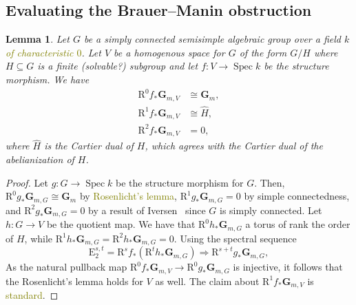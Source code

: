 \documentclass[10pt,letterpaper,twoside]{article}
\newcommand{\BA}[1]{\textcolor{olive}{#1}}
\newcommand{\E}{\mathrm{E}}
\newcommand{\R}{\mathrm{R}}
\renewcommand{\1}{\mathbf{1}}
\newcommand{\bG}{\mathbf{G}}
\newcommand{\Gm}{\bG_{m}}
\DeclareMathOperator{\Spec}{Spec}
\newcommand{\iso}{\cong}
\theoremstyle{plain}
\newtheorem{lemma}[theorem]{Lemma}
\theoremstyle{plain}
\theoremstyle{definition}
\theoremstyle{named}
\theoremstyle{definition}
\begin{document}
	
	
	\subsection{Evaluating the Brauer--Manin obstruction}
	
	
	\begin{lemma}
		Let $G$ be a simply connected semisimple algebraic group over a field $k$ \BA{of characteristic
			$0$}. Let $V$ be a homogenous space for $G$ of
		the form $G/H$ where $H\subseteq G$ is a finite (solvable?) subgroup and let $f\colon
		V\rightarrow\Spec k$ be the structure morphism. We have
		\begin{align*}
			\R^0f_*\bG_{m,V}&\iso\Gm,\\
			\R^1f_*\bG_{m,V}&\iso\widehat{H},\\
			\R^2f_*\bG_{m,V}&=0,
		\end{align*}
		where $\widehat{H}$ is the Cartier dual of $H$, which agrees with the Cartier dual of the
		abelianization of $H$.
	\end{lemma}
	
	\begin{proof}
		Let $g\colon G\rightarrow\Spec k$ be the structure morphism for $G$.
		Then, $\R^0g_*\bG_{m,G}\iso\Gm$ by
		\BA{Rosenlicht's lemma}, $\R^1g_*\bG_{m,G}=0$ by simple connectedness, and $\R^2g_*\bG_{m,G}=0$
		by a result of Iversen~\cite{iversen} since $G$ is simply connected. Let $h\colon G\rightarrow
		V$ be the quotient map. We have that $\R^0h_*\bG_{m,G}$ a torus of rank the order of $H$, while
		$\R^1h_*\bG_{m,G}=\R^2h_*\bG_{m,G}=0$. 
		Using the spectral sequence $$\E_2^{s,t}=\R^s f_*(\R^t h_*\bG_{m,G})\Rightarrow\R^{s+t}
		g_*\bG_{m,G},$$
		As the natural pullback map $\R^0f_*\bG_{m,V}\rightarrow\R^0g_*\bG_{m,G}$ is
		injective, it follows that the Rosenlicht's lemma holds for $V$ as well. The claim about
		$\R^1f_*\bG_{m,V}$ is \BA{standard}.
	\end{proof}
	
	
	
	
	
	
	
	
	
	
	
	
	
	
	\small
	
	
	
\end{document}
